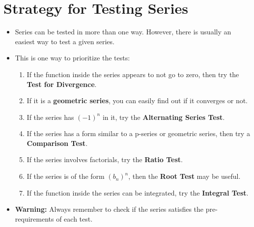 \documentclass{report}
\begin{document}
	\section{Strategy for Testing Series}
		\begin{itemize}\addtolength{\leftskip}{2em}
			\item Series can be tested in more than one way. However, there is usually an easiest way to test a given series. 
			\item This is one way to prioritize the tests:
			\begin{enumerate}\addtolength{\leftskip}{4em}
				\item If the function inside the series appears to not go to zero, then try the \textbf{Test for Divergence}.
				\item If it is a\textbf{ geometric series}, you can easily find out if it converges or not.
				\item If the series has $(-1)^n$ in it, try the \textbf{Alternating Series Test}.
				\item If the series has a form similar to a p-series or geometric series, then try a \textbf{Comparison Test}.
				\item If the series involves factorials, try the \textbf{Ratio Test}.
				\item If the series is of the form $(b_n)^n$, then the \textbf{Root Test} may be useful.
				\item If the function inside the series can be integrated, try the \textbf{Integral Test}.
			\end{enumerate}
			\item \textbf{Warning:} Always remember to check if the series satisfies the pre-requirements of each test.
		\end{itemize}
\end{document}
